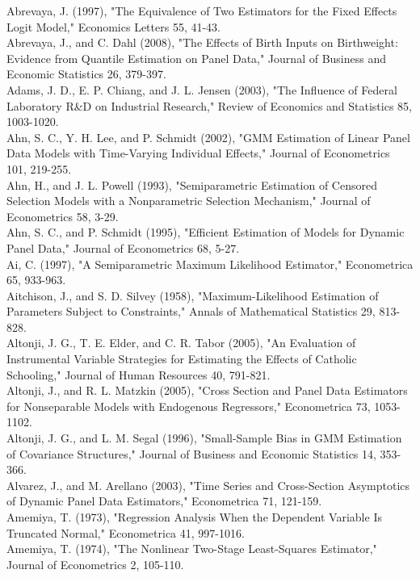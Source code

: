 \documentclass[10pt]{article}
\begin{document}
Abrevaya, J. (1997), "The Equivalence of Two Estimators for the Fixed Effects Logit Model," Economics Letters 55, 41-43.\\
Abrevaya, J., and C. Dahl (2008), "The Effects of Birth Inputs on Birthweight: Evidence from Quantile Estimation on Panel Data," Journal of Business and Economic Statistics 26, 379-397.\\
Adams, J. D., E. P. Chiang, and J. L. Jensen (2003), "The Influence of Federal Laboratory R\&D on Industrial Research," Review of Economics and Statistics 85, 1003-1020.\\
Ahn, S. C., Y. H. Lee, and P. Schmidt (2002), "GMM Estimation of Linear Panel Data Models with Time-Varying Individual Effects," Journal of Econometrics 101, 219-255.\\
Ahn, H., and J. L. Powell (1993), "Semiparametric Estimation of Censored Selection Models with a Nonparametric Selection Mechanism," Journal of Econometrics 58, 3-29.\\
Ahn, S. C., and P. Schmidt (1995), "Efficient Estimation of Models for Dynamic Panel Data," Journal of Econometrics 68, 5-27.\\
Ai, C. (1997), "A Semiparametric Maximum Likelihood Estimator," Econometrica 65, 933-963.\\
Aitchison, J., and S. D. Silvey (1958), "Maximum-Likelihood Estimation of Parameters Subject to Constraints," Annals of Mathematical Statistics 29, 813-828.\\
Altonji, J. G., T. E. Elder, and C. R. Tabor (2005), "An Evaluation of Instrumental Variable Strategies for Estimating the Effects of Catholic Schooling," Journal of Human Resources 40, 791-821.\\
Altonji, J., and R. L. Matzkin (2005), "Cross Section and Panel Data Estimators for Nonseparable Models with Endogenous Regressors," Econometrica 73, 1053-1102.\\
Altonji, J. G., and L. M. Segal (1996), "Small-Sample Bias in GMM Estimation of Covariance Structures," Journal of Business and Economic Statistics 14, 353-366.\\
Alvarez, J., and M. Arellano (2003), "Time Series and Cross-Section Asymptotics of Dynamic Panel Data Estimators," Econometrica 71, 121-159.\\
Amemiya, T. (1973), "Regression Analysis When the Dependent Variable Is Truncated Normal," Econometrica 41, 997-1016.\\
Amemiya, T. (1974), "The Nonlinear Two-Stage Least-Squares Estimator," Journal of Econometrics 2, 105-110.
\end{document}
